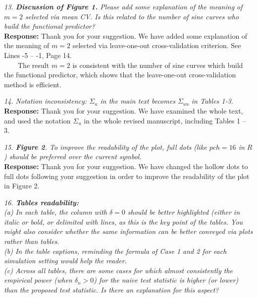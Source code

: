 \documentclass[12pt]{report}
\begin{document}
\begin{description}
\item {{ \textcolor[rgb]{0.00,0.50,1.00}{\em 13.  {\bf {Discussion of Figure 1.}} Please add some explanation of the meaning of $m = 2$ selected via
mean CV. Is this related to the number of sine curves who build the functional predictor?}}}\\

{ \bf Response: } Thank you for your suggestion. We have added some explanation of the meaning of $m=2$ selected via leave-one-out cross-validation criterion. See Lines -5 -- -1,  Page 14.\\

\ \ \ \ The result $m = 2$ is consistent with the
number of sine curves which build the functional predictor, which shows that the leave-one-out cross-validation method is efficient.\\


\item {{ \textcolor[rgb]{0.00,0.50,1.00}{\em 14.  Notation inconsistency: $\Sigma_u$ in the main text becomes $\Sigma_{uu}$ in Tables 1-3.}}}\\

{ \bf Response: } Thank you for your suggestion. We have examined the whole text, and used the notation $\Sigma_u$ in the whole revised manuscript, including Tables 1 -- 3.\\

\item {{ \textcolor[rgb]{0.00,0.50,1.00}{\em 15.  {\bf { Figure 2}}. To improve the readability of the plot, full dots (like $pch=16$ in $R$) should be
preferred over the current symbol.}}}\\

{ \bf Response: } Thank you for your suggestion. We have changed the hollow dots to full dots following your suggestion in order to improve the readability of the plot in Figure 2.\\

\item {{ \textcolor[rgb]{0.00,0.50,1.00}{\em 16.  {\bf { Tables readability:}} \\
(a) In each table, the column with $\delta=0$ should be better highlighted (either in italic or bold,
or delimited with lines, as this is the key point of the tables. You might also consider
whether the same information can be better conveyed via plots rather than tables.\\
(b) In the table captions, reminding the formula of Case 1 and 2 for each simulation setting
would help the reader.\\
(c) Across all tables, there are some cases for which almost consistently the empirical power
(when $\delta_n>0$) for the naive test statistic is higher (or lower) than the proposed test
statistic. Is there an explanation for this aspect?\\
}}}


\end{description}
\end{document}
